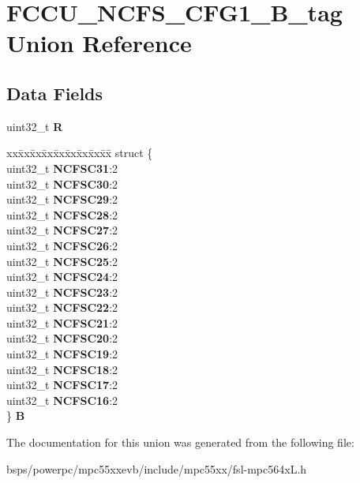 \hypertarget{unionFCCU__NCFS__CFG1__32B__tag}{}\section{F\+C\+C\+U\+\_\+\+N\+C\+F\+S\+\_\+\+C\+F\+G1\+\_\+B\+\_\+tag Union Reference}
\label{unionFCCU__NCFS__CFG1__32B__tag}
\subsection*{Data Fields}
\begin{DoxyCompactItemize}
\item 
\mbox{\label{unionFCCU__NCFS__CFG1__32B__tag_a247fa092d152b9cc1d62d3b0545ad13d}} 
uint32\+\_\+t {\bfseries R}
\item 
\mbox{\label{unionFCCU__NCFS__CFG1__32B__tag_a54f27bbc5031d9afe4aa0287acd1a093}} 
\begin{tabbing}
xx\=xx\=xx\=xx\=xx\=xx\=xx\=xx\=xx\=\kill
struct \{\\
\>uint32\_t {\bfseries NCFSC31}:2\\
\>uint32\_t {\bfseries NCFSC30}:2\\
\>uint32\_t {\bfseries NCFSC29}:2\\
\>uint32\_t {\bfseries NCFSC28}:2\\
\>uint32\_t {\bfseries NCFSC27}:2\\
\>uint32\_t {\bfseries NCFSC26}:2\\
\>uint32\_t {\bfseries NCFSC25}:2\\
\>uint32\_t {\bfseries NCFSC24}:2\\
\>uint32\_t {\bfseries NCFSC23}:2\\
\>uint32\_t {\bfseries NCFSC22}:2\\
\>uint32\_t {\bfseries NCFSC21}:2\\
\>uint32\_t {\bfseries NCFSC20}:2\\
\>uint32\_t {\bfseries NCFSC19}:2\\
\>uint32\_t {\bfseries NCFSC18}:2\\
\>uint32\_t {\bfseries NCFSC17}:2\\
\>uint32\_t {\bfseries NCFSC16}:2\\
\} {\bfseries B}\\

\end{tabbing}\end{DoxyCompactItemize}


The documentation for this union was generated from the following file\+:\begin{DoxyCompactItemize}
\item 
bsps/powerpc/mpc55xxevb/include/mpc55xx/fsl-\/mpc564x\+L.\+h\end{DoxyCompactItemize}
